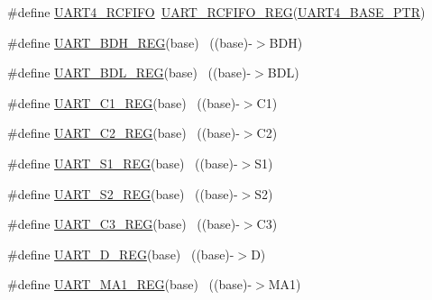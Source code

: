 \begin{DoxyCompactItemize}
\item 
\#define \hyperlink{group___u_a_r_t___register___accessor___macros_gaa6d9298d8e3b404c384433e2d61bab99}{U\+A\+R\+T4\+\_\+\+R\+C\+F\+I\+FO}~\hyperlink{group___u_a_r_t___register___accessor___macros_ga45b1614543eafe052567800963874056}{U\+A\+R\+T\+\_\+\+R\+C\+F\+I\+F\+O\+\_\+\+R\+EG}(\hyperlink{group___u_a_r_t___peripheral_ga680f97e081544c697ee071702b2de587}{U\+A\+R\+T4\+\_\+\+B\+A\+S\+E\+\_\+\+P\+TR})
\item 
\#define \hyperlink{group___u_a_r_t___register___accessor___macros_ga3cad0e41deb6b429abe066c0ef976e27}{U\+A\+R\+T\+\_\+\+B\+D\+H\+\_\+\+R\+EG}(base)                                          ~((base)-\/$>$B\+DH)
\item 
\#define \hyperlink{group___u_a_r_t___register___accessor___macros_ga5a5b3d9a31233e9411d5faf9f75cef37}{U\+A\+R\+T\+\_\+\+B\+D\+L\+\_\+\+R\+EG}(base)                                          ~((base)-\/$>$B\+DL)
\item 
\#define \hyperlink{group___u_a_r_t___register___accessor___macros_gaf1364840dbdc70f6ca2931518a3f0c04}{U\+A\+R\+T\+\_\+\+C1\+\_\+\+R\+EG}(base)                                            ~((base)-\/$>$C1)
\item 
\#define \hyperlink{group___u_a_r_t___register___accessor___macros_ga09dd2d71c0fb360ed55f2ef2aca2cdcd}{U\+A\+R\+T\+\_\+\+C2\+\_\+\+R\+EG}(base)                                            ~((base)-\/$>$C2)
\item 
\#define \hyperlink{group___u_a_r_t___register___accessor___macros_gae94e819cfe08eebd802bc5d3c2bd4c05}{U\+A\+R\+T\+\_\+\+S1\+\_\+\+R\+EG}(base)                                            ~((base)-\/$>$S1)
\item 
\#define \hyperlink{group___u_a_r_t___register___accessor___macros_ga02efefc75cacb156375e2bff39a1f497}{U\+A\+R\+T\+\_\+\+S2\+\_\+\+R\+EG}(base)                                            ~((base)-\/$>$S2)
\item 
\#define \hyperlink{group___u_a_r_t___register___accessor___macros_ga94048a3faaadf9a76ac1e9ea865d7f4e}{U\+A\+R\+T\+\_\+\+C3\+\_\+\+R\+EG}(base)                                            ~((base)-\/$>$C3)
\item 
\#define \hyperlink{group___u_a_r_t___register___accessor___macros_ga53bbf3e214fcc4cba0059aca0184ce6f}{U\+A\+R\+T\+\_\+\+D\+\_\+\+R\+EG}(base)                                              ~((base)-\/$>$D)
\item 
\#define \hyperlink{group___u_a_r_t___register___accessor___macros_ga429d595b0b07bc30a6d62832eec7ba1b}{U\+A\+R\+T\+\_\+\+M\+A1\+\_\+\+R\+EG}(base)                                          ~((base)-\/$>$M\+A1)

\end{DoxyCompactItemize}
